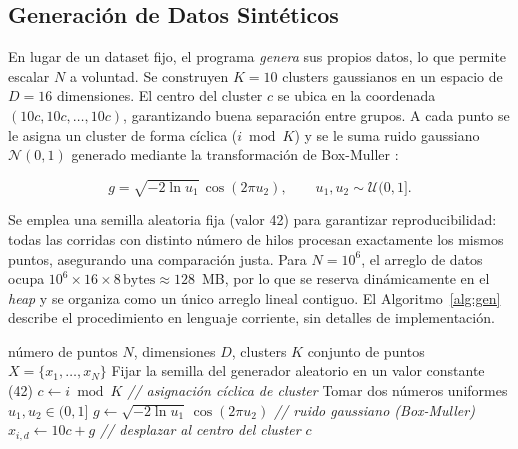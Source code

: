 \documentclass[conference]{IEEEtran}
\begin{document}
\subsection{Generaci\'on de Datos Sint\'eticos}

En lugar de un dataset fijo, el programa \emph{genera} sus propios datos, lo
que permite escalar $N$ a voluntad.
Se construyen $K{=}10$ clusters gaussianos en un espacio de $D{=}16$
dimensiones.
El centro del cluster $c$ se ubica en la coordenada $(10c, 10c, \ldots, 10c)$,
garantizando buena separaci\'on entre grupos.
A cada punto se le asigna un cluster de forma c\'iclica ($i \bmod K$) y se le
suma ruido gaussiano $\mathcal{N}(0,1)$ generado mediante la transformaci\'on
de Box-Muller \cite{box1958}:

\begin{equation}
  g = \sqrt{-2\ln u_1}\,\cos(2\pi u_2),
  \qquad u_1, u_2 \sim \mathcal{U}(0,1].
\end{equation}

Se emplea una semilla aleatoria fija (valor 42) para garantizar
reproducibilidad: todas las corridas con distinto n\'umero de hilos procesan
exactamente los mismos puntos, asegurando una comparaci\'on justa.
Para $N{=}10^6$, el arreglo de datos ocupa
$10^6 \times 16 \times 8\,\text{bytes} \approx 128$~MB, por lo que se reserva
din\'amicamente en el \emph{heap} y se organiza como un \'unico arreglo lineal
contiguo.
El Algoritmo~\ref{alg:gen} describe el procedimiento en lenguaje corriente,
sin detalles de implementaci\'on.

\begin{algorithm}[H]
\caption{Generaci\'on de datos sint\'eticos gaussianos}
\label{alg:gen}
\begin{algorithmic}[1]
\REQUIRE n\'umero de puntos $N$, dimensiones $D$, clusters $K$
\ENSURE conjunto de puntos $X=\{x_1,\ldots,x_N\}$
\STATE Fijar la semilla del generador aleatorio en un valor constante (42)
  \STATE $c \gets i \bmod K$ \quad\textit{// asignaci\'on c\'iclica de cluster}
    \STATE Tomar dos n\'umeros uniformes $u_1, u_2 \in (0,1]$
    \STATE $g \gets \sqrt{-2\ln u_1}\,\cos(2\pi u_2)$
           \quad\textit{// ruido gaussiano (Box-Muller)}
    \STATE $x_{i,d} \gets 10c + g$
           \quad\textit{// desplazar al centro del cluster $c$}
  \ENDFOR
\ENDFOR
\end{algorithmic}
\end{algorithm}
\end{document}
